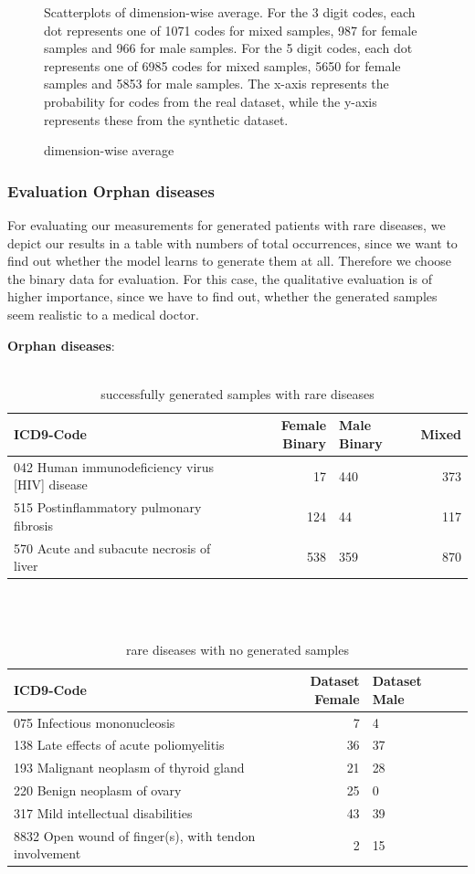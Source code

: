 \documentclass[11pt, a4paper]{book}
\begin{document}
\begin{figure}
\caption{dimension-wise average}
\small
\begin{flushleft}
Scatterplots of dimension-wise average. For the 3 digit codes, each dot represents one of 1071 codes for mixed samples, 987 for female samples and 966 for male samples. For the 5 digit codes, each dot represents one of 6985 codes for mixed samples, 5650 for female samples and 5853 for male samples. The x-axis represents the probability for codes from the real dataset, while the y-axis represents these from the synthetic dataset.
\end{flushleft}
\label{fig:figure3}
\end{figure}

\subsubsection{Evaluation Orphan diseases}
For evaluating our measurements for generated patients with rare diseases, we depict our results in a table with numbers of total occurrences, since we want to find out whether the model learns to generate them at all. 
Therefore we choose the binary data for evaluation.
For this case, the qualitative evaluation is of higher importance, since we have to find out, whether the generated samples seem realistic to a medical doctor.


\textbf{Orphan diseases}:
\\
\\
\begin{table}
\begin{tabularx}{\textwidth}{p{}|r|X|r}
ICD9-Code & Female Binary & Male Binary & Mixed\\
\hline
042 Human immunodeficiency virus [HIV] disease	& 17 & 440 & 373\\
515 Postinflammatory pulmonary fibrosis & 124 & 44 & 117\\
570 Acute and subacute necrosis of liver & 538	& 359 & 870\\
\end{tabularx}
\caption{\label{tab:rare-generataed}successfully generated samples with rare diseases}
\end{table}
\\
\\
\begin{table}
\begin{tabularx}{\textwidth}{p{}|r|X|r}
ICD9-Code & Dataset Female & Dataset Male\\
\hline
075 Infectious mononucleosis & 7 & 4\\
138 Late effects of acute poliomyelitis & 36 & 37 \\
193 Malignant neoplasm of thyroid gland & 21 & 28 \\
220 Benign neoplasm of ovary & 25	& 0\\
317 Mild intellectual disabilities & 43 & 39\\
8832 Open wound of finger(s), with tendon involvement & 2 & 15\\ 
\end{tabularx}
\caption{\label{tab:rare-not-generated}rare diseases with no generated samples}
\end{table}
\end{document}
